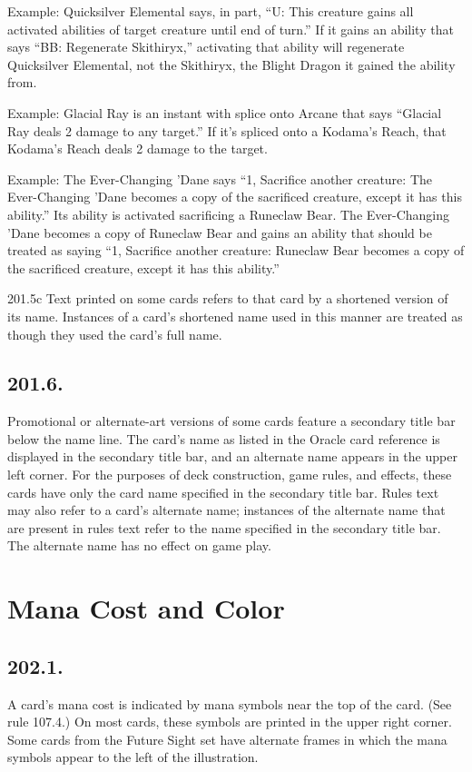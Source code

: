 Example: Quicksilver Elemental says, in part, “{U}: This creature gains all activated abilities of target creature until end of turn.” If it gains an ability that says “{BB}: Regenerate Skithiryx,” activating that ability will regenerate Quicksilver Elemental, not the Skithiryx, the Blight Dragon it gained the ability from.

Example: Glacial Ray is an instant with splice onto Arcane that says “Glacial Ray deals 2 damage to any target.” If it’s spliced onto a Kodama’s Reach, that Kodama’s Reach deals 2 damage to the target.

Example: The Ever-Changing ’Dane says “{1}, Sacrifice another creature: The Ever-Changing ’Dane becomes a copy of the sacrificed creature, except it has this ability.” Its ability is activated sacrificing a Runeclaw Bear. The Ever-Changing ’Dane becomes a copy of Runeclaw Bear and gains an ability that should be treated as saying “{1}, Sacrifice another creature: Runeclaw Bear becomes a copy of the sacrificed creature, except it has this ability.”

201.5c Text printed on some cards refers to that card by a shortened version of its name. Instances of a card’s shortened name used in this manner are treated as though they used the card’s full name.

\subsection*{201.6.}
Promotional or alternate-art versions of some cards feature a secondary title bar below the name line. The card’s name as listed in the Oracle card reference is displayed in the secondary title bar, and an alternate name appears in the upper left corner. For the purposes of deck construction, game rules, and effects, these cards have only the card name specified in the secondary title bar. Rules text may also refer to a card’s alternate name; instances of the alternate name that are present in rules text refer to the name specified in the secondary title bar. The alternate name has no effect on game play.

\section{Mana Cost and Color}
\subsection*{202.1.}
A card’s mana cost is indicated by mana symbols near the top of the card. (See rule 107.4.) On most cards, these symbols are printed in the upper right corner. Some cards from the Future Sight set have alternate frames in which the mana symbols appear to the left of the illustration.

